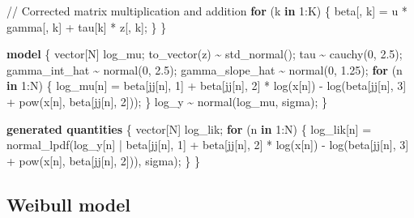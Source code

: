 \documentclass[
  12pt,
  letterpaper,
  DIV=11,
  numbers=noendperiod]{scrartcl}
\newenvironment{Shaded}{\begin{snugshade}}{\end{snugshade}}
\newcommand{\CommentTok}[1]{\textcolor[rgb]{0.37,0.37,0.37}{#1}}
\newcommand{\ControlFlowTok}[1]{\textcolor[rgb]{0.00,0.23,0.31}{\textbf{#1}}}
\newcommand{\DataTypeTok}[1]{\textcolor[rgb]{0.68,0.00,0.00}{#1}}
\newcommand{\DecValTok}[1]{\textcolor[rgb]{0.68,0.00,0.00}{#1}}
\newcommand{\FloatTok}[1]{\textcolor[rgb]{0.68,0.00,0.00}{#1}}
\newcommand{\KeywordTok}[1]{\textcolor[rgb]{0.00,0.23,0.31}{\textbf{#1}}}
\newcommand{\NormalTok}[1]{\textcolor[rgb]{0.00,0.23,0.31}{#1}}
\begin{document}
\begin{Shaded}
\begin{Highlighting}[]
  \CommentTok{// Corrected matrix multiplication and addition}
  \ControlFlowTok{for}\NormalTok{ (k }\ControlFlowTok{in} \DecValTok{1}\NormalTok{:K) \{}
\NormalTok{    beta[, k] = u * gamma[, k] + tau[k] * z[, k];}
\NormalTok{  \}}
\NormalTok{\}}

\KeywordTok{model}\NormalTok{ \{}
  \DataTypeTok{vector}\NormalTok{[N] log\_mu;}
\NormalTok{  to\_vector(z) \textasciitilde{} std\_normal();}
\NormalTok{  tau \textasciitilde{} cauchy(}\DecValTok{0}\NormalTok{, }\FloatTok{2.5}\NormalTok{);}
\NormalTok{  gamma\_int\_hat \textasciitilde{} normal(}\DecValTok{0}\NormalTok{, }\FloatTok{2.5}\NormalTok{);}
\NormalTok{  gamma\_slope\_hat \textasciitilde{} normal(}\DecValTok{0}\NormalTok{, }\FloatTok{1.25}\NormalTok{);}
  \ControlFlowTok{for}\NormalTok{ (n }\ControlFlowTok{in} \DecValTok{1}\NormalTok{:N) \{}
\NormalTok{    log\_mu[n] = beta[jj[n], }\DecValTok{1}\NormalTok{] + beta[jj[n], }\DecValTok{2}\NormalTok{] * log(x[n]) {-}}
\NormalTok{      log(beta[jj[n], }\DecValTok{3}\NormalTok{] + pow(x[n], beta[jj[n], }\DecValTok{2}\NormalTok{]));}
\NormalTok{  \}}
\NormalTok{  log\_y \textasciitilde{} normal(log\_mu, sigma);}
\NormalTok{\}}

\KeywordTok{generated quantities}\NormalTok{ \{}
  \DataTypeTok{vector}\NormalTok{[N] log\_lik;}
  \ControlFlowTok{for}\NormalTok{ (n }\ControlFlowTok{in} \DecValTok{1}\NormalTok{:N) \{}
\NormalTok{    log\_lik[n] = normal\_lpdf(log\_y[n] |}
\NormalTok{      beta[jj[n], }\DecValTok{1}\NormalTok{] +}
\NormalTok{      beta[jj[n], }\DecValTok{2}\NormalTok{] * log(x[n]) {-}}
\NormalTok{      log(beta[jj[n], }\DecValTok{3}\NormalTok{] + pow(x[n], beta[jj[n], }\DecValTok{2}\NormalTok{])),}
\NormalTok{      sigma);}
\NormalTok{  \}}
\NormalTok{\}}
\end{Highlighting}
\end{Shaded}

\newpage

\subsection{Weibull model}\label{weibull-model}
\end{document}
